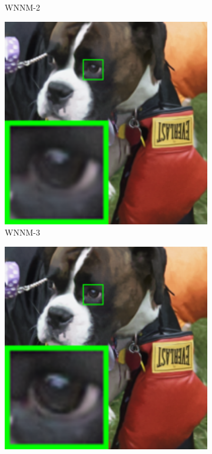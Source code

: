 \begin{figure}
\begin{subfigure}[t]{0.19\textwidth}
		\caption{WNNM-2}
    \end{subfigure}
    \hfill
    \begin{subfigure}[t]{0.19\textwidth}
        \centering
        \includegraphics[width=1\textwidth]{images/mcwnnm/resize_br_WNNM_ADMM_dog.png}
		\caption{WNNM-3}
    \end{subfigure}
    \hfill
    \begin{subfigure}[t]{0.19\textwidth}
        \centering
        \includegraphics[width=1\textwidth]{images/mcwnnm/resize_br_CWNNM_ADMM_NL_dog.png}

\end{subfigure}
\end{figure}
